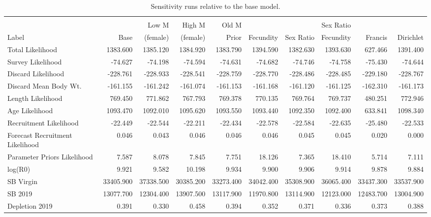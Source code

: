 \documentclass[12pt,]{article}
\begin{document}
\begin{landscape}
\begingroup\fontsize{9pt}{10pt}\selectfont
\begin{longtable}{lrrrrrrrrr}
\caption{Sensitivity runs relative to the base model.} \\ 
  \hline
 &  &  &  &  &  &  &  &  &  \\ 
        &      & Low M    & High M   &  Old M  &           &            & Sex Ratio &          &          \\
 Label & Base & (female) & (female) &  Prior  & Fecundity &  Sex Ratio & Fecundity & Francis & Dirichlet \\
 \hline
Total Likelihood & 1383.600 & 1385.120 & 1384.920 & 1383.790 & 1394.590 & 1382.630 & 1393.630 & 627.466 & 1391.400 \\ 
  Survey Likelihood & -74.627 & -74.198 & -74.594 & -74.631 & -74.682 & -74.746 & -74.758 & -75.430 & -74.644 \\ 
  Discard Likelihood & -228.761 & -228.933 & -228.541 & -228.759 & -228.770 & -228.486 & -228.485 & -229.180 & -228.767 \\ 
  Discard Mean Body Wt. & -161.155 & -161.242 & -161.074 & -161.153 & -161.168 & -161.120 & -161.125 & -162.310 & -161.173 \\ 
  Length Likelihood & 769.450 & 771.862 & 767.793 & 769.378 & 770.135 & 769.764 & 769.737 & 480.251 & 772.946 \\ 
  Age Likelihood & 1093.470 & 1092.010 & 1095.620 & 1093.550 & 1093.440 & 1092.350 & 1092.400 & 633.841 & 1098.340 \\ 
  Recruitment Likelihood & -22.449 & -22.544 & -22.211 & -22.434 & -22.578 & -22.584 & -22.635 & -25.480 & -22.533 \\ 
  Forecast Recruitment Likelihood & 0.046 & 0.043 & 0.046 & 0.046 & 0.046 & 0.045 & 0.045 & 0.020 & 0.000 \\ 
  Parameter Priors Likelihood & 7.587 & 8.078 & 7.845 & 7.751 & 18.126 & 7.365 & 18.410 & 5.714 & 7.111 \\ 
  log(R0) & 9.921 & 9.582 & 10.198 & 9.934 & 9.900 & 9.906 & 9.914 & 9.878 & 9.884 \\ 
  SB Virgin & 33405.900 & 37338.500 & 30385.200 & 33273.400 & 34042.400 & 35308.900 & 36065.400 & 33437.300 & 33537.900 \\ 
  SB 2019 & 13077.700 & 12304.400 & 13907.500 & 13117.900 & 11970.800 & 13114.900 & 12123.000 & 12483.700 & 13004.900 \\ 
  Depletion 2019 & 0.391 & 0.330 & 0.458 & 0.394 & 0.352 & 0.371 & 0.336 & 0.373 & 0.388 \\ 

\end{longtable}
\end{landscape}
\end{document}
